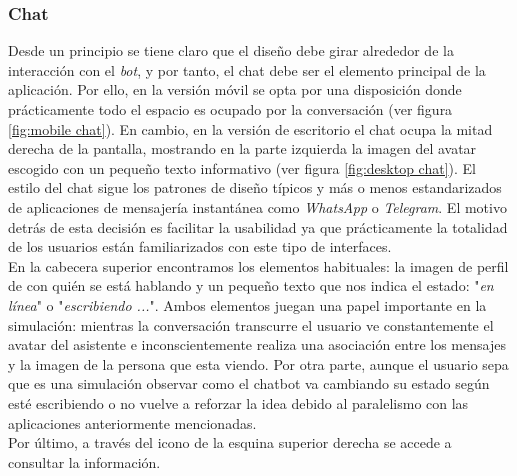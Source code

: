 \subsubsection{Chat}
Desde un principio se tiene claro que el diseño debe girar alrededor de la interacción con el \textit{bot}, y por tanto, el chat debe ser el elemento principal de la aplicación. Por ello, en la versión móvil se opta por una disposición donde prácticamente todo el espacio es ocupado por la conversación (ver figura \ref{fig:mobile chat}). En cambio, en la versión de escritorio el chat ocupa la mitad derecha de la pantalla, mostrando en la parte izquierda la imagen del avatar escogido con un pequeño texto informativo (ver figura \ref{fig:desktop chat}). El estilo del chat sigue los patrones de diseño típicos y más o menos estandarizados de aplicaciones de mensajería instantánea como \textit{WhatsApp} o \textit{Telegram}. El motivo detrás de esta decisión es facilitar la usabilidad ya que prácticamente la totalidad de los usuarios están familiarizados con este tipo de interfaces.\\

En la cabecera superior encontramos los elementos habituales: la imagen de perfil de con quién se está hablando y un pequeño texto que nos indica el estado: "\textit{en línea}" o "\textit{escribiendo ...}". Ambos elementos juegan una papel importante en la simulación: mientras la conversación transcurre el usuario ve constantemente el avatar del asistente e inconscientemente realiza una asociación entre los mensajes y la imagen de la persona que esta viendo. Por otra parte, aunque el usuario sepa que es una simulación observar como el chatbot va cambiando su estado según esté escribiendo o no vuelve a reforzar la idea debido al paralelismo con las aplicaciones anteriormente mencionadas.\\

Por último, a través del icono de la esquina superior derecha se accede a consultar la información.\\


